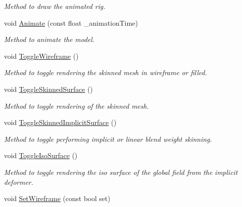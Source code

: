 \begin{DoxyCompactItemize}
\begin{DoxyCompactList}\small\item\em Method to draw the animated rig. \end{DoxyCompactList}\item 
void \hyperlink{classModel_a72cc0344f05776e6bbbb9ec82ed0b7b6}{Animate} (const float \+\_\+animation\+Time)
\begin{DoxyCompactList}\small\item\em Method to animate the model. \end{DoxyCompactList}\item 
void \hyperlink{classModel_ad8697962971f8443f3e1bfd474e6ac20}{Toggle\+Wireframe} ()\hypertarget{classModel_ad8697962971f8443f3e1bfd474e6ac20}{}\label{classModel_ad8697962971f8443f3e1bfd474e6ac20}

\begin{DoxyCompactList}\small\item\em Method to toggle rendering the skinned mesh in wireframe or filled. \end{DoxyCompactList}\item 
void \hyperlink{classModel_a7ce564f5eb3e962970bc285305a352f7}{Toggle\+Skinned\+Surface} ()\hypertarget{classModel_a7ce564f5eb3e962970bc285305a352f7}{}\label{classModel_a7ce564f5eb3e962970bc285305a352f7}

\begin{DoxyCompactList}\small\item\em Method to toggle rendering of the skinned mesh. \end{DoxyCompactList}\item 
void \hyperlink{classModel_ad453680f0603420e226c2aa4a74db9dd}{Toggle\+Skinned\+Implicit\+Surface} ()\hypertarget{classModel_ad453680f0603420e226c2aa4a74db9dd}{}\label{classModel_ad453680f0603420e226c2aa4a74db9dd}

\begin{DoxyCompactList}\small\item\em Method to toggle performing implicit or linear blend weight skinning. \end{DoxyCompactList}\item 
void \hyperlink{classModel_ac97e2c6ccbe0937d0c7b5aed1bfceb04}{Toggle\+Iso\+Surface} ()\hypertarget{classModel_ac97e2c6ccbe0937d0c7b5aed1bfceb04}{}\label{classModel_ac97e2c6ccbe0937d0c7b5aed1bfceb04}

\begin{DoxyCompactList}\small\item\em Method to toggle rendering the iso surface of the global field from the implicit deformer. \end{DoxyCompactList}\item 
void \hyperlink{classModel_a9047abd858e3e6a1ea167e5ef1825fb1}{Set\+Wireframe} (const bool set)\hypertarget{classModel_a9047abd858e3e6a1ea167e5ef1825fb1}{}\label{classModel_a9047abd858e3e6a1ea167e5ef1825fb1}


\end{DoxyCompactItemize}
